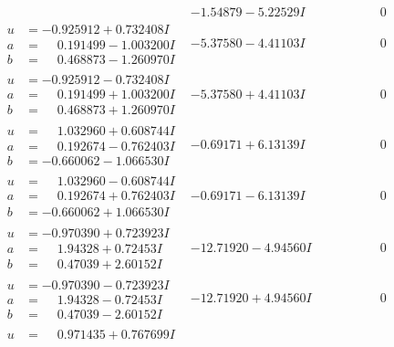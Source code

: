 \documentclass[1p]{elsarticle_modified}
\theoremstyle{definition}
\begin{document}
$$\begin{array}{c|c|c}
 & -1.54879 - 5.22529 I & \phantom{-0.000000 } 0 \\ \hline\begin{aligned}
u &= -0.925912 + 0.732408 I \\
a &= \phantom{-}0.191499 - 1.003200 I \\
b &= \phantom{-}0.468873 - 1.260970 I\end{aligned}
 & -5.37580 - 4.41103 I & \phantom{-0.000000 } 0 \\ \hline\begin{aligned}
u &= -0.925912 - 0.732408 I \\
a &= \phantom{-}0.191499 + 1.003200 I \\
b &= \phantom{-}0.468873 + 1.260970 I\end{aligned}
 & -5.37580 + 4.41103 I & \phantom{-0.000000 } 0 \\ \hline\begin{aligned}
u &= \phantom{-}1.032960 + 0.608744 I \\
a &= \phantom{-}0.192674 - 0.762403 I \\
b &= -0.660062 - 1.066530 I\end{aligned}
 & -0.69171 + 6.13139 I & \phantom{-0.000000 } 0 \\ \hline\begin{aligned}
u &= \phantom{-}1.032960 - 0.608744 I \\
a &= \phantom{-}0.192674 + 0.762403 I \\
b &= -0.660062 + 1.066530 I\end{aligned}
 & -0.69171 - 6.13139 I & \phantom{-0.000000 } 0 \\ \hline\begin{aligned}
u &= -0.970390 + 0.723923 I \\
a &= \phantom{-}1.94328 + 0.72453 I \\
b &= \phantom{-}0.47039 + 2.60152 I\end{aligned}
 & -12.71920 - 4.94560 I & \phantom{-0.000000 } 0 \\ \hline\begin{aligned}
u &= -0.970390 - 0.723923 I \\
a &= \phantom{-}1.94328 - 0.72453 I \\
b &= \phantom{-}0.47039 - 2.60152 I\end{aligned}
 & -12.71920 + 4.94560 I & \phantom{-0.000000 } 0 \\ \hline\begin{aligned}
u &= \phantom{-}0.971435 + 0.767699 I \\

\end{aligned}
\end{array}$$
\end{document}

